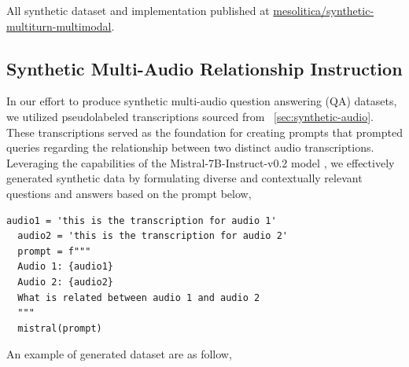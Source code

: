 \documentclass[preprint]{article}
\begin{document}
All synthetic dataset and implementation published at \href{https://huggingface.co/datasets/mesolitica/synthetic-multiturn-multimodal#multi-images}{mesolitica/synthetic-multiturn-multimodal}.

\subsection{Synthetic Multi-Audio Relationship Instruction}

In our effort to produce synthetic multi-audio question answering (QA) datasets, we utilized pseudolabeled transcriptions sourced from ~\ref{sec:synthetic-audio}. These transcriptions served as the foundation for creating prompts that prompted queries regarding the relationship between two distinct audio transcriptions. Leveraging the capabilities of the Mistral-7B-Instruct-v0.2 model \cite{jiang2023mistral}, we effectively generated synthetic data by formulating diverse and contextually relevant questions and answers based on the prompt below,

\begin{lstlisting}[breaklines=true]
  audio1 = 'this is the transcription for audio 1'
  audio2 = 'this is the transcription for audio 2'
  prompt = f"""
  Audio 1: {audio1} 
  Audio 2: {audio2}
  What is related between audio 1 and audio 2
  """
  mistral(prompt)
\end{lstlisting}

An example of generated dataset are as follow,
\end{document}

